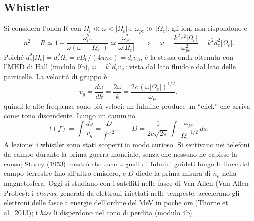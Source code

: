 \subsection{Whistler}
Si considera l'onda R con $\Omega_i\ll\omega<|\Omega_e|$ e $\omega_{pe}\gg|\Omega_e|$: gli ioni non rispondono e
\begin{equation}
n^2=R\simeq1-\frac{\omega_{pe}^2}{\omega(\omega-|\Omega_e|)}\simeq\frac{\omega_{pe}^2}{\omega|\Omega_e|}\quad\Rightarrow\quad\omega=\frac{k^2c^2|\Omega_e|}{\omega_{pe}^2}=k^2d_e^2|\Omega_e| .
\end{equation}
Poiché $d_e^2|\Omega_e|=d_i^2\Omega_i=cB_0/(4\pi ne)=d_iv_A$, è la stessa onda ottenuta con l'MHD di Hall (modulo 9b), $\omega=k^2d_iv_A$: vista dal lato fluido e dal lato delle particelle. La velocità di gruppo è
\begin{equation}
v_g=\frac{d\omega}{dk}=\frac{2\omega}{k}=\frac{2c\,(\omega|\Omega_e|)^{1/2}}{\omega_{pe}},
\end{equation}
quindi le alte frequenze sono più veloci: un fulmine produce un ``click'' che arriva come tono discendente. Lungo un cammino
\begin{equation}
t(f)=\int\frac{ds}{v_g}=\frac{D}{f^{1/2}},\qquad D=\frac{1}{2c\sqrt{2\pi}}\int\frac{\omega_{pe}}{|\Omega_e|^{1/2}}\,ds .
\end{equation}
A lezione: i whistler sono stati scoperti in modo curioso. Si sentivano nei telefoni da campo durante la prima guerra mondiale, senza che nessuno ne capisse la causa; Storey (1953) mostrò che sono segnali di fulmini guidati lungo le linee del campo terrestre fino all'altro emisfero, e $D$ diede la prima misura di $n_e$ nella magnetosfera. Oggi si studiano con i satelliti nelle fasce di Van Allen (Van Allen Probes): i \emph{chorus}, generati da elettroni iniettati nelle tempeste, accelerano gli elettroni delle fasce a energie dell'ordine del MeV in poche ore (Thorne et al.~2013); i \emph{hiss} li disperdono nel cono di perdita (modulo 4b).

